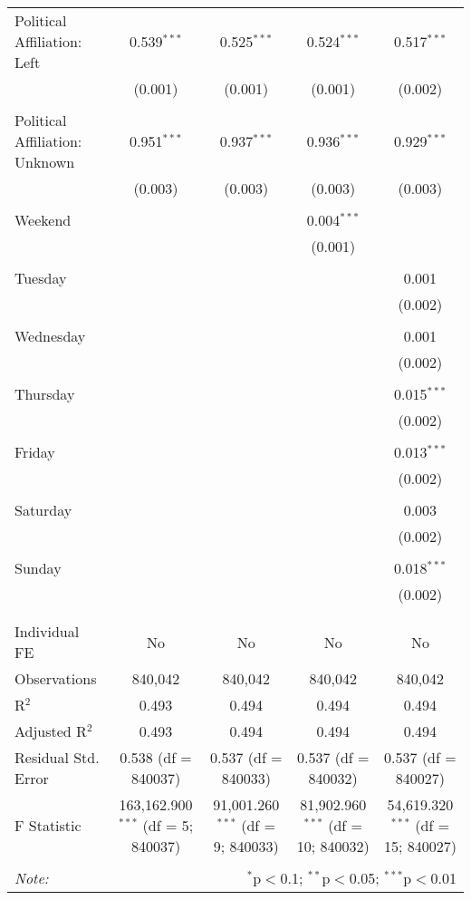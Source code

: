 \documentclass[
]{article}
\begin{document}
\begin{table}[!htbp]
{\begin{tabular}{@{\extracolsep{5pt}}lcccc}
 Political Affiliation: Left & 0.539$^{***}$ & 0.525$^{***}$ & 0.524$^{***}$ & 0.517$^{***}$ \\ 
  & (0.001) & (0.001) & (0.001) & (0.002) \\ 
  & & & & \\ 
 Political Affiliation: Unknown & 0.951$^{***}$ & 0.937$^{***}$ & 0.936$^{***}$ & 0.929$^{***}$ \\ 
  & (0.003) & (0.003) & (0.003) & (0.003) \\ 
  & & & & \\ 
 Weekend &  &  & 0.004$^{***}$ &  \\ 
  &  &  & (0.001) &  \\ 
  & & & & \\ 
 Tuesday &  &  &  & 0.001 \\ 
  &  &  &  & (0.002) \\ 
  & & & & \\ 
 Wednesday &  &  &  & 0.001 \\ 
  &  &  &  & (0.002) \\ 
  & & & & \\ 
 Thursday &  &  &  & 0.015$^{***}$ \\ 
  &  &  &  & (0.002) \\ 
  & & & & \\ 
 Friday &  &  &  & 0.013$^{***}$ \\ 
  &  &  &  & (0.002) \\ 
  & & & & \\ 
 Saturday &  &  &  & 0.003 \\ 
  &  &  &  & (0.002) \\ 
  & & & & \\ 
 Sunday &  &  &  & 0.018$^{***}$ \\ 
  &  &  &  & (0.002) \\ 
  & & & & \\ 
\hline \\[-1.8ex] 
Individual FE & No & No & No & No \\ 
Observations & 840,042 & 840,042 & 840,042 & 840,042 \\ 
R$^{2}$ & 0.493 & 0.494 & 0.494 & 0.494 \\ 
Adjusted R$^{2}$ & 0.493 & 0.494 & 0.494 & 0.494 \\ 
Residual Std. Error & 0.538 (df = 840037) & 0.537 (df = 840033) & 0.537 (df = 840032) & 0.537 (df = 840027) \\ 
F Statistic & 163,162.900$^{***}$ (df = 5; 840037) & 91,001.260$^{***}$ (df = 9; 840033) & 81,902.960$^{***}$ (df = 10; 840032) & 54,619.320$^{***}$ (df = 15; 840027) \\ 
\hline 
\hline \\[-1.8ex] 
\textit{Note:}  & \multicolumn{4}{r}{$^{*}$p$<$0.1; $^{**}$p$<$0.05; $^{***}$p$<$0.01} \\ 
\end{tabular}
} 
\end{table} 
\newpage
\end{document}
